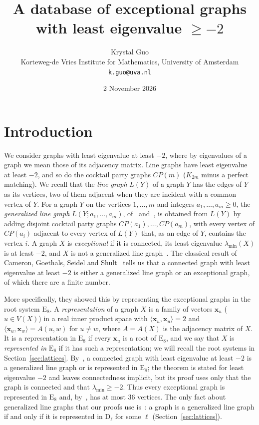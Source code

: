 \documentclass[11pt]{article}
\title{A database of exceptional graphs\\ with least eigenvalue $\ge-2$}
\author{Krystal Guo\\
\normalsize Korteweg-de Vries Institute for Mathematics, University of Amsterdam\\
\normalsize\texttt{k.guo@uva.nl}}
\date{2 November 2026}
\newcommand\Zx{{\mathbf x}}
\newcommand\ip[2]{\langle#1,#2\rangle}
\theoremstyle{definition}
\newcommand{\typ}[1]{\mathrm{#1}}
\newcommand{\lmin}{\lambda_{\min}}
\begin{document}
\raggedbottom
\maketitle
\begin{abstract}

\end{abstract}

\section{Introduction}\label{sec:intro}

We consider graphs with least eigenvalue at least $-2$, where by eigenvalues of a graph we mean
those of its adjacency matrix. Line graphs have least eigenvalue at least $-2$, and so do the
cocktail party graphs $CP(m)$ ($K_{2m}$ minus a perfect matching). We recall that the
\textsl{line graph} $L(Y)$ of a graph $Y$ has the edges of $Y$ as its vertices, two of them
adjacent when they are incident with a common vertex of $Y$. For a graph $Y$ on the vertices
$1,\dots,m$ and integers $a_1,\dots,a_m\ge0$, the \textsl{generalized line graph}
$L(Y;a_1,\dots,a_m)$, of~\cite[\S4]{CGSS} and~\cite[\S1.1]{CRS04}, is obtained from $L(Y)$ by
adding disjoint cocktail party graphs $CP(a_1),\dots,CP(a_m)$, with every vertex of $CP(a_i)$
adjacent to every vertex of $L(Y)$ that, as an edge of $Y$, contains the vertex $i$. A graph $X$
is \textsl{exceptional} if it is connected, its least eigenvalue $\lmin(X)$ is at least $-2$, and
$X$ is not a generalized line graph~\cite[\S1.1]{CRS04}. The classical result of Cameron,
Goethals, Seidel and Shult~\cite{CGSS} tells us that a connected graph with least eigenvalue at
least $-2$ is either a generalized line graph or an exceptional graph, of which there are a
finite number.

More specifically, they showed this by representing the exceptional graphs in the root system
$\typ E_8$. A \textsl{representation} of a graph $X$ is a family of vectors $\Zx_u$
($u\in V(X)$) in a real inner product space with $\ip{\Zx_u}{\Zx_u}=2$ and
$\ip{\Zx_u}{\Zx_w}=A(u,w)$ for $u\ne w$, where $A=A(X)$ is the adjacency matrix of $X$. It is a
representation in $\typ E_8$ if every $\Zx_u$ is a root of $\typ E_8$, and we say that $X$ is
\textsl{represented in} $\typ E_8$ if it has such a representation; we will recall the root
systems in Section~\ref{sec:lattices}. By~\cite[Theorem~4.10]{CGSS}, a connected graph with least
eigenvalue at least $-2$ is a generalized line graph or is represented in $\typ E_8$; the theorem
is stated for least eigenvalue $-2$ and leaves connectedness implicit, but its proof uses only
that the graph is connected and that $\lmin\ge-2$. Thus every
exceptional graph is represented in $\typ E_8$ and, by~\cite[Theorem~4.3]{CGSS}, has at most
$36$ vertices. The only fact about generalized line graphs that our proofs use
is~\cite[Theorem~4.2]{CGSS}: a graph is a generalized line graph if and only if it is
represented in $\typ D_\ell$ for some $\ell$ (Section~\ref{sec:lattices}).
\end{document}
